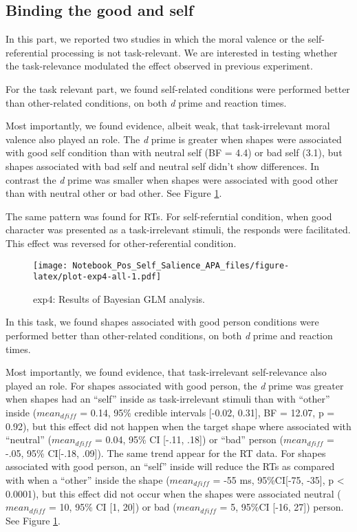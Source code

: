 \documentclass[
  english,
  man]{apa6}
\begin{document}
\hypertarget{binding-the-good-and-self}{%
\subsection{Binding the good and self}\label{binding-the-good-and-self}}

In this part, we reported two studies in which the moral valence or the self-referential processing is not task-relevant. We are interested in testing whether the task-relevance modulated the effect observed in previous experiment.

For the task relevant part, we found self-related conditions were performed better than other-related conditions, on both \emph{d} prime and reaction times.

Most importantly, we found evidence, albeit weak, that task-irrelevant moral valence also played an role. The \emph{d} prime is greater when shapes were associated with good self condition than with neutral self (BF = 4.4) or bad self (3.1), but shapes associated with bad self and neutral self didn't show differences. In contrast the \emph{d} prime was smaller when shapes were associated with good other than with neutral other or bad other. See Figure \ref{fig:plot-exp4-all}.

The same pattern was found for RTs. For self-referntial condition, when good character was presented as a task-irrelevant stimuli, the responds were facilitated. This effect was reversed for other-referential condition.

\begin{figure}
\centering
\texttt{[image: Notebook\_Pos\_Self\_Salience\_APA\_files/figure-latex/plot-exp4-all-1.pdf]}
\caption{\label{fig:plot-exp4-all}exp4: Results of Bayesian GLM analysis.}
\end{figure}

In this task, we found shapes associated with good person conditions were performed better than other-related conditions, on both \emph{d} prime and reaction times.

Most importantly, we found evidence, that task-irrelevant self-relevance also played an role. For shapes associated with good person, the \emph{d} prime was greater when shapes had an ``self'' inside as task-irrelevant stimuli than with ``other'' inside (\(mean_{dfiff}\) = 0.14, 95\% credible intervals {[}-0.02, 0.31{]}, BF = 12.07, p = 0.92), but this effect did not happen when the target shape where associated with ``neutral'' (\(mean_{dfiff}\) = 0.04, 95\% CI {[}-.11, .18{]}) or ``bad'' person (\(mean_{dfiff}\) = -.05, 95\% CI{[}-.18, .09{]}). The same trend appear for the RT data. For shapes associated with good person, an ``self'' inside will reduce the RTs as compared with when a ``other'' inside the shape (\(mean_{dfiff}\) = -55 ms, 95\%CI{[}-75, -35{]}, p \textless{} 0.0001), but this effect did not occur when the shapes were associated neutral (\(mean_{dfiff}\) = 10, 95\% CI {[}1, 20{]}) or bad (\(mean_{dfiff}\) = 5, 95\%CI {[}-16, 27{]}) person. See Figure \ref{fig:plot-exp4-all}.
\end{document}
